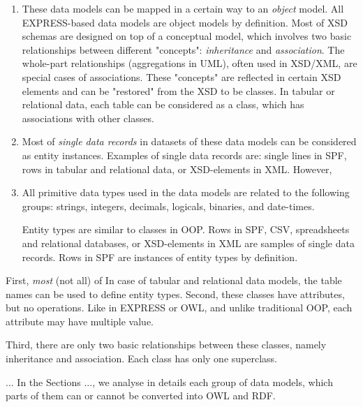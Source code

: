 \begin{enumerate}

\item
These data models can be mapped in a certain way to an \emph{object} model. All EXPRESS-based data models are object models by definition. Most of XSD schemas are designed on top of a conceptual model, which involves two basic relationships between different "concepts": \emph{inheritance} and \emph{association}.
The whole-part relationships (aggregations in UML), often used in XSD/XML, are special cases of associations.
These "concepts" are reflected in certain XSD elements and can be "restored" from the XSD to be classes.
In tabular or relational data, each table can be considered as a class, which has associations with other classes.

\item
Most of \emph{single data records} in datasets of these data models can be considered as entity instances.
Examples of single data records are: single lines in SPF, rows in tabular and relational data, or XSD-elements in XML.
However, 


\item
All primitive data types used in the data models are related to the following groups: strings, integers, decimals, logicals, binaries, and date-times.


Entity types are similar to classes in OOP.
Rows in SPF, CSV, spreadsheets and relational databases, or XSD-elements in XML are samples of single data records. 
Rows in SPF are instances of entity types by definition.
\end{enumerate}
First, \emph{most} (not all) of 
In case of tabular and relational data models, the table names can be used to define entity types.
Second, these classes have attributes, but no operations.
Like in EXPRESS or OWL, and unlike traditional OOP, each attribute may have multiple value.




Third, there are only two basic relationships between these classes, namely inheritance and association.
Each class has only one superclass. 


... In the Sections ..., we analyse in details each group of data models, which parts of them can or cannot be converted into OWL and RDF.















